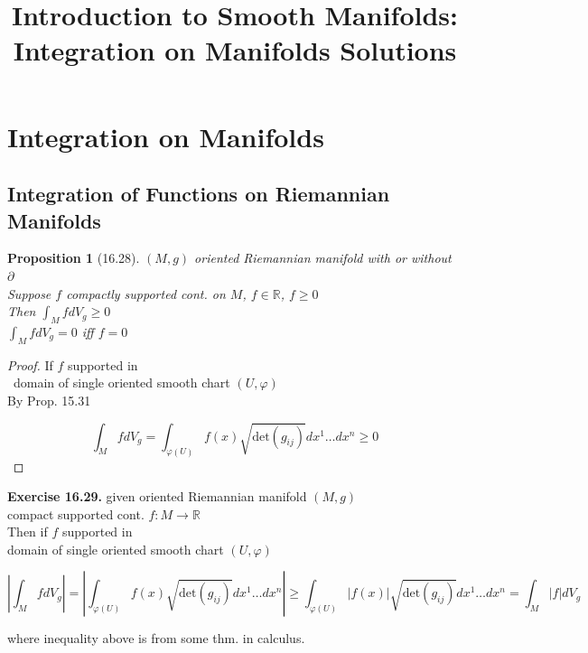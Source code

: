\documentclass[11pt]{amsart}
\title{Introduction to Smooth Manifolds: Integration on Manifolds Solutions}
\newtheorem{proposition}{Proposition}
\theoremstyle{definition}
\newcommand{\exercisehead}[1]{\medskip\noindent\textbf{Exercise #1.} }
\begin{document}
\maketitle
\section{Integration on Manifolds}


\subsection*{Integration of Functions on Riemannian Manifolds}

\begin{proposition}[16.28]
  $(M,g)$ oriented Riemannian manifold with or without $\partial$ \\
Suppose $f$ compactly supported cont. on $M$, $f\in \mathbb{R}$, $f\geq 0$ \\
Then $\int_M f dV_g \geq 0$ \\
\phantom{Then } $\int_M f dV_g = 0$ iff $f=0$
\end{proposition}

\begin{proof}
  If $f$ supported in \\
\quad \, domain of single oriented smooth chart $(U,\varphi)$  \\

By Prop. 15.31


\[
\int_M f dV_g = \int_{ \varphi{(U)}} f(x) \sqrt{ \text{det}{ (g_{ij} ) } } dx^1 \dots dx^n \geq 0
\]




\end{proof}

\exercisehead{16.29} given oriented Riemannian manifold $(M,g)$ \\
\quad compact supported cont. $f: M \to \mathbb{R}$ \\

Then if $f$ supported in \\
\phantom{Then } domain of single oriented smooth chart $(U,\varphi)$

\[
\left| \int_M f dV_g \right| = \left| \int_{ \varphi{ (U)} } f(x) \sqrt{ \text{det}{ (g_{ij} )} } dx^1 \dots dx^n \right| \geq \int_{\varphi{ (U)} } |f(x) | \sqrt{ \text{det}{ (g_{ij})} } dx^1 \dots dx^n = \int_M |f| dV_g
\]

where inequality above is from some thm. in calculus.
\end{document}
